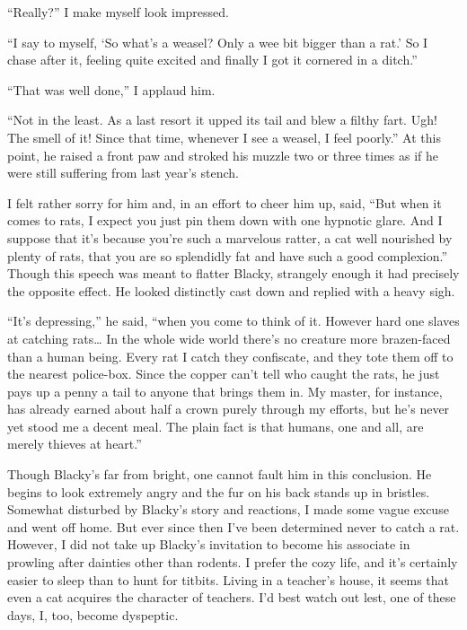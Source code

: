 \documentclass[12pt, openright]{book}
\begin{document}
``Really?'' I make myself look impressed.

``I say to myself, `So what's a weasel? Only a wee bit bigger than a
rat.' So I chase after it, feeling quite excited and finally I got it
cornered in a ditch.''

``That was well done,'' I applaud him.

``Not in the least. As a last resort it upped its tail and blew a filthy
fart. Ugh! The smell of it! Since that time, whenever I see a weasel, I
feel poorly.'' At this point, he raised a front paw and stroked his
muzzle two or three times as if he were still suffering from last year's
stench.

I felt rather sorry for him and, in an effort to cheer him up, said,
``But when it comes to rats, I expect you just pin them down with one
hypnotic glare. And I suppose that it's because you're such a marvelous
ratter, a cat well nourished by plenty of rats, that you are so
splendidly fat and have such a good complexion.'' Though this speech was
meant to flatter Blacky, strangely enough it had precisely the opposite
effect. He looked distinctly cast down and replied with a heavy sigh.

``It's depressing,'' he said, ``when you come to think of it. However
hard one slaves at catching rats\ldots{} In the whole wide world there's
no creature more brazen-faced than a human being. Every rat I catch they
confiscate, and they tote them off to the nearest police-box. Since the
copper can't tell who caught the rats, he just pays up a penny a tail to
anyone that brings them in. My master, for instance, has already earned
about half a crown purely through my efforts, but he's never yet stood
me a decent meal. The plain fact is that humans, one and all, are merely
thieves at heart.''

Though Blacky's far from bright, one cannot fault him in this
conclusion. He begins to look extremely angry and the fur on his back
stands up in bristles. Somewhat disturbed by Blacky's story and
reactions, I made some vague excuse and went off home. But ever since
then I've been determined never to catch a rat. However, I did not take
up Blacky's invitation to become his associate in prowling after
dainties other than rodents. I prefer the cozy life, and it's certainly
easier to sleep than to hunt for titbits. Living in a teacher's house,
it seems that even a cat acquires the character of teachers. I'd best
watch out lest, one of these days, I, too, become dyspeptic.
\end{document}
